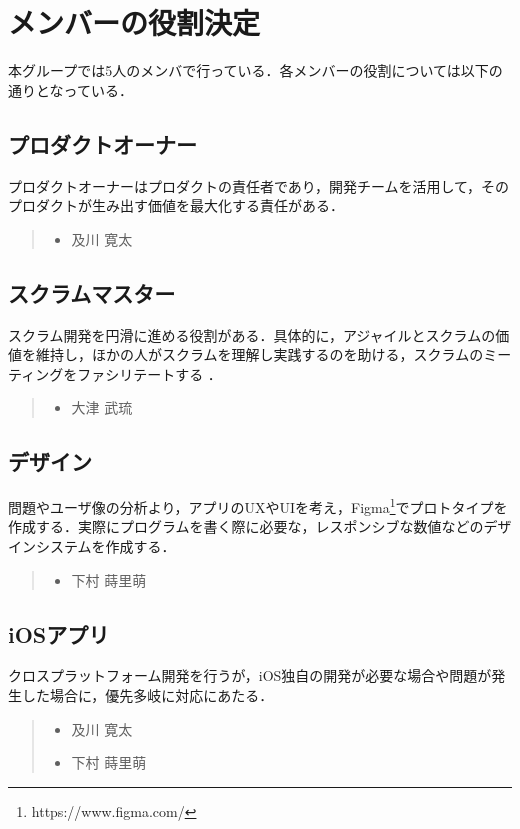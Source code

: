 \section{メンバーの役割決定}
本グループでは5人のメンバで行っている．各メンバーの役割については以下の通りとなっている．

\subsection{プロダクトオーナー}
プロダクトオーナーはプロダクトの責任者であり，開発チームを活用して，そのプロダクトが生み出す価値を最大化する責任がある\cite{scrum}．
\begin{quote}
    \begin{itemize}
        \item 及川 寛太
    \end{itemize}
\end{quote}

\subsection{スクラムマスター}
スクラム開発を円滑に進める役割がある．具体的に，アジャイルとスクラムの価値を維持し，ほかの人がスクラムを理解し実践するのを助ける，スクラムのミーティングをファシリテートする \cite{scrummaster}．
\begin{quote}
    \begin{itemize}
        \item 大津 武琉
    \end{itemize}
\end{quote}

\subsection{デザイン}
問題やユーザ像の分析より，アプリのUXやUIを考え，Figma\footnote{https://www.figma.com/}でプロトタイプを作成する．実際にプログラムを書く際に必要な，レスポンシブな数値などのデザインシステムを作成する．
\begin{quote}
    \begin{itemize}
        \item 下村 蒔里萌
    \end{itemize}
\end{quote}

\subsection{iOSアプリ}
クロスプラットフォーム開発を行うが，iOS独自の開発が必要な場合や問題が発生した場合に，優先多岐に対応にあたる．
\begin{quote}
    \begin{itemize}
        \item 及川 寛太
        \item 下村 蒔里萌
    \end{itemize}
\end{quote}
\pagebreak
